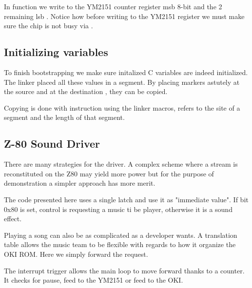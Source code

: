 

In function  we write to the YM2151 counter register msb 8-bit  and the 2 remaining lsb . Notice how before writing to the YM2151 register we must make sure the chip is not busy via .





\subsection{Initializing variables}
To finish bootstrapping we make sure initalized C variables are indeed initialized. The linker placed all these values in a  segment. By placing markers astutely at the source  and at the destination , they can be copied.



Copying is done with  instruction using the linker macros,  refers to the site of a segment and  the length of that segment.


 



\subsection{Z-80 Sound Driver}
There are many strategies for the driver. A complex scheme where a stream is reconstituted on the Z80 may yield more power but for the purpose of demonstration a simpler approach has more merit.

The code presented here uses a single latch and use it as "immediate value". If bit 0x80 is set, control is requesting a music ti be player, otherwise it is a sound effect. 

Playing a song can also be as complicated as a developer wants. A translation table allows the music team to be flexible with regards to how it organize the OKI ROM. Here we simply forward the request.

The interrupt trigger allows the main loop to move forward thanks to a counter. It checks for pause, feed to the YM2151 or feed to the OKI.








